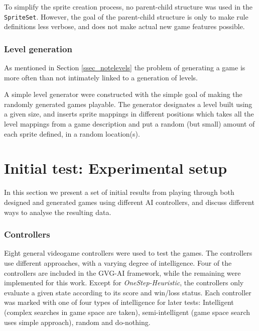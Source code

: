 \documentclass[a4paper,titlepage,final]{report}
\begin{document}
To simplify the sprite creation process, no parent-child structure was used in the \texttt{SpriteSet}.
However, the goal of the parent-child structure is only to make rule definitions less verbose, and does not make actual new game features possible.




\subsubsection*{Level generation}
As mentioned in Section \ref{ssec_notelevels} the problem of generating a game is more often than not intimately linked to a generation of levels.

A simple level generator were constructed with the simple goal of making the randomly generated games playable.
The generator designates a level built using a given size, and inserts sprite mappings in different positions
 which takes all the level mappings from a game description and put a random (but small) amount of each sprite defined, in a random location(s).




\section{Initial test: Experimental setup}
In this section we present a set of initial results from playing through both designed and generated games using different AI controllers, and discuss different ways to analyse the resulting data.


\subsubsection*{Controllers}
Eight general videogame controllers were used to test the games. The controllers use different approaches, with a varying degree of intelligence. Four of the controllers are included in the GVG-AI framework, while the remaining were implemented for this work. Except for \emph{OneStep-Heuristic}, the controllers only evaluate a given state according to its score and win/loss status.
Each controller was marked with one of four types of intelligence for later tests: Intelligent (complex searches in game space are taken), semi-intelligent (game space search uses simple approach), random and do-nothing.
\end{document}
